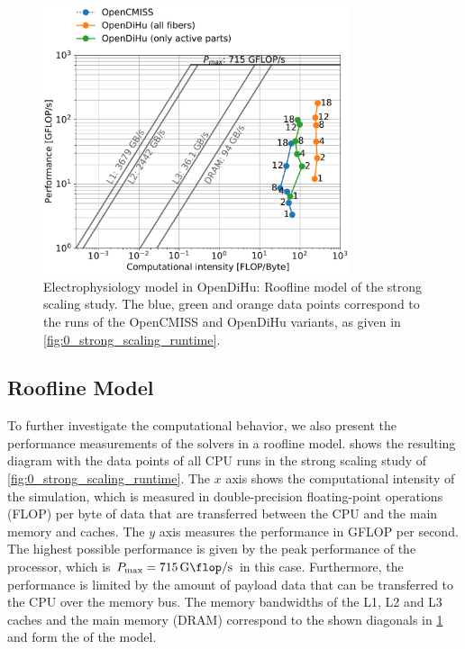 \begin{figure}[H]
  \centering%
  \includegraphics[width=0.8\textwidth]{images/results/studies/0_roofline.pdf}%
  \caption{Electrophysiology model in OpenDiHu: Roofline model of the strong scaling study. The blue, green and orange data points correspond to the runs of the OpenCMISS and OpenDiHu variants, as given in \cref{fig:0_strong_scaling_runtime}.}%
  \label{fig:0_roofline}%
\end{figure}%

\subsection{Roofline Model}\label{sec:roofline_model}
To further investigate the computational behavior, we also present the performance measurements of the solvers in a roofline model. 
 shows the resulting diagram with the data points of all CPU runs in the strong scaling study of \cref{fig:0_strong_scaling_runtime}. The $x$ axis shows the computational intensity of the simulation, which is measured in double-precision floating-point operations (FLOP) per byte of data that are transferred between the CPU and the main memory and caches. The $y$ axis measures the performance in GFLOP per second. The highest possible performance is given by the peak performance of the processor, which is $P_\text{max} = \SI{715}{\giga\flop\per\second}$ in this case. Furthermore, the performance is limited by the amount of payload data that can be transferred to the CPU over the memory bus. The memory bandwidths of the L1, L2 and L3 caches and the main memory (DRAM) correspond to the shown diagonals in \cref{fig:0_roofline} and form the  of the model.


